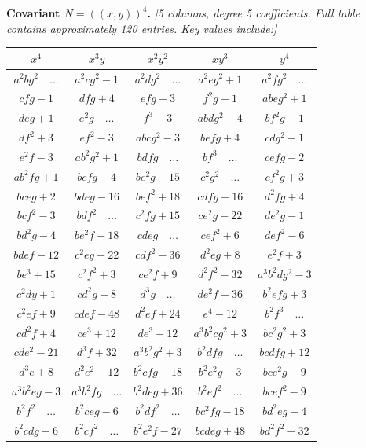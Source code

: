 \documentclass[11pt,a4paper]{article}
\theoremstyle{cayley}
\begin{document}
\textbf{Covariant $N = (\!\!(x,y)\!\!)^{4}$.} \textit{[5 columns, degree 5 coefficients. Full table contains approximately 120 entries. Key values include:]}
\begin{center}
\small
\begin{tabular}{|c|c|c|c|c|}
\hline
$x^{4}$ & $x^{3}y$ & $x^{2}y^{2}$ & $xy^{3}$ & $y^{4}$ \\
\hline
$a^{2}bg^{2}\quad\dots$ & $a^{2}cg^{2}-1$ & $a^{2}dg^{2}\quad\dots$ & $a^{2}eg^{2}+1$ & $a^{2}fg^{2}\quad\dots$ \\
$cfg-1$ & $dfg+4$ & $efg+3$ & $f^{2}g-1$ & $abeg^{2}+1$ \\
$deg+1$ & $e^{2}g\quad\dots$ & $f^{3}-3$ & $abdg^{2}-4$ & $bf^{2}g-1$ \\
$df^{2}+3$ & $ef^{2}-3$ & $abcg^{2}-3$ & $befg+4$ & $cdg^{2}-1$ \\
$e^{2}f-3$ & $ab^{2}g^{2}+1$ & $bdfg\quad\dots$ & $bf^{3}\quad\dots$ & $cefg-2$ \\
$ab^{2}fg+1$ & $bcfg-4$ & $be^{2}g-15$ & $c^{2}g^{2}\quad\dots$ & $cf^{2}g+3$ \\
$bceg+2$ & $bdeg-16$ & $bef^{2}+18$ & $cdfg+16$ & $d^{2}fg+4$ \\
$bcf^{2}-3$ & $bdf^{2}\quad\dots$ & $c^{2}fg+15$ & $ce^{2}g-22$ & $de^{2}g-1$ \\
$bd^{2}g-4$ & $be^{2}f+18$ & $cdeg\quad\dots$ & $cef^{2}+6$ & $def^{2}-6$ \\
$bdef-12$ & $c^{2}eg+22$ & $cdf^{2}-36$ & $d^{2}eg+8$ & $e^{2}f+3$ \\
$be^{3}+15$ & $c^{2}f^{2}+3$ & $ce^{2}f+9$ & $d^{2}f^{2}-32$ & $a^{3}b^{2}dg^{2}-3$ \\
$c^{2}dy+1$ & $cd^{2}g-8$ & $d^{3}g\quad\dots$ & $de^{2}f+36$ & $b^{2}efg+3$ \\
$c^{2}ef+9$ & $cdef-48$ & $d^{2}ef+24$ & $e^{4}-12$ & $b^{2}f^{3}\quad\dots$ \\
$cd^{2}f+4$ & $ce^{3}+12$ & $de^{3}-12$ & $a^{3}b^{2}cg^{2}+3$ & $bc^{2}g^{2}+3$ \\
$cde^{2}-21$ & $d^{3}f+32$ & $a^{3}b^{2}g^{2}+3$ & $b^{2}dfg\quad\dots$ & $bcdfg+12$ \\
$d^{3}e+8$ & $d^{2}e^{2}-12$ & $b^{2}cfg-18$ & $b^{2}e^{2}g-3$ & $bce^{2}g-9$ \\
$a^{3}b^{2}eg-3$ & $a^{3}b^{2}fg\quad\dots$ & $b^{2}deg+36$ & $b^{2}ef^{2}\quad\dots$ & $bcef^{2}-9$ \\
$b^{2}f^{2}\quad\dots$ & $b^{2}ceg-6$ & $b^{2}df^{2}\quad\dots$ & $bc^{2}fg-18$ & $bd^{2}eg-4$ \\
$b^{2}cdg+6$ & $b^{2}cf^{2}\quad\dots$ & $b^{2}e^{2}f-27$ & $bcdeg+48$ & $bd^{2}f^{2}-32$ \\

\end{tabular}
\end{center}
\end{document}

